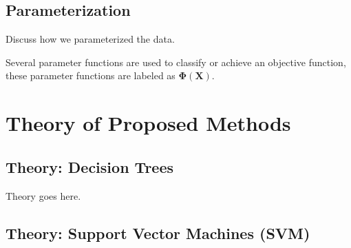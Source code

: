 \documentclass[fleqn]{article}
\begin{document}
\subsection{Parameterization}
\label{subsec:Parameterization}
Discuss how we parameterized the data.

Several parameter functions are used to classify or achieve an objective function, these parameter functions are labeled as $\mathbf{\Phi}\left(\mathbf{X}\right)$. 

\section{Theory of Proposed Methods}
\label{sec:Theory}

\subsection{Theory: Decision Trees}
\label{sub:theoryDecisionTrees}
Theory goes here.

\subsection{Theory: Support Vector Machines (SVM)}
\label{sub:theorySVM}
\end{document}
